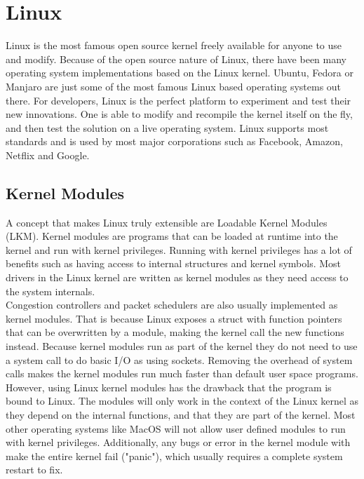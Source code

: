 \documentclass[a4paper,english, 11pt]{report}
\begin{document}
\section{Linux}

Linux is the most famous open source kernel freely available for anyone to use and modify. Because of the open source nature of Linux, there have been many operating system implementations based on the Linux kernel. Ubuntu, Fedora or Manjaro are just some of the most famous Linux based operating systems out there. For developers, Linux is the perfect platform to experiment and test their new innovations. One is able to modify and recompile the kernel itself on the fly, and then test the solution on a live operating system. Linux supports most standards and is used by most major corporations such as Facebook, Amazon, Netflix and Google.

\subsection{Kernel Modules}
A concept that makes Linux truly extensible are Loadable Kernel Modules (LKM). Kernel modules are programs that can be loaded at runtime into the kernel and run with kernel privileges. Running with kernel privileges has a lot of benefits such as having access to internal structures and kernel symbols. Most drivers in the Linux kernel are written as kernel modules as they need access to the system internals.\\

Congestion controllers and packet schedulers are also usually implemented as kernel modules. That is because Linux exposes a struct with function pointers that can be overwritten by a module, making the kernel call the new functions instead. Because kernel modules run as part of the kernel they do not need to use a system call to do basic I/O as using sockets. Removing the overhead of system calls makes the kernel modules run much faster than default user space programs.\\

However, using Linux kernel modules has the drawback that the program is bound to Linux. The modules will only work in the context of the Linux kernel as they depend on the internal functions, and that they are part of the kernel. Most other operating systems like MacOS will not allow user defined modules to run with kernel privileges. Additionally, any bugs or error in the kernel module with make the entire kernel fail ("panic"), which usually requires a complete system restart to fix.
\end{document}
